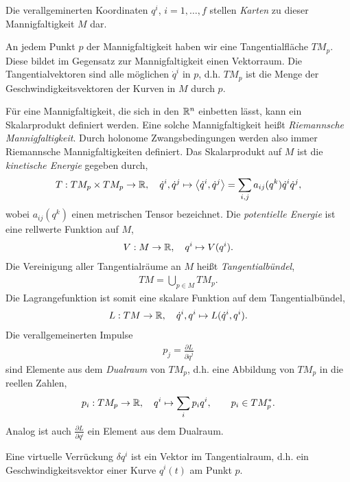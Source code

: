 Die verallgeminerten Koordinaten $q^i$, $i=1,\ldots,f$ stellen \emph{Karten} zu
dieser Mannigfaltigkeit $M$ dar.

An jedem Punkt $p$ der Mannigfaltigkeit haben wir eine Tangentialfläche $TM_p$.
Diese bildet im Gegensatz zur Mannigfaltigkeit einen Vektorraum. Die
Tangentialvektoren sind alle möglichen $\dot{q}^i$ in $p$, d.h. $TM_p$ ist
die Menge der Geschwindigkeitsvektoren der Kurven in $M$ durch $p$.

Für eine Mannigfaltigkeit, die sich in den $\mathbb{R}^n$ einbetten lässt, kann ein
Skalarprodukt definiert werden. Eine solche Mannigfaltigkeit heißt
\emph{Riemannsche Mannigfaltigkeit}. Durch holonome Zwangsbedingungen werden
also immer Riemannsche Mannigfaltigkeiten definiert. Das Skalarprodukt auf $M$ ist die
\emph{kinetische Energie} gegeben durch,
\begin{align*}
T: TM_p\times TM_p \to \mathbb{R},\quad \dot{q}^i,\dot{q}^j \mapsto
\left\langle\dot{q}^i,\dot{q}^j\right\rangle = \sum\limits_{i,j} a_{ij}(q^k)\dot{q}^i\dot{q}^j,
\end{align*}
wobei $a_{ij}(q^k)$ einen metrischen Tensor bezeichnet.
Die \emph{potentielle Energie} ist eine rellwerte Funktion auf $M$,
\begin{align*}
V: M\to \mathbb{R},\quad q^i \mapsto V(q^i).
\end{align*}
Die Vereinigung aller Tangentialräume an $M$ heißt \emph{Tangentialbündel},
\begin{align*}
TM = \bigcup\limits_{p\in M} TM_p.
\end{align*}
Die Lagrangefunktion ist somit eine skalare Funktion auf dem Tangentialbündel,
\begin{align*}
L : TM\to\mathbb{R},\quad \dot{q}^i,q^i  \mapsto L(\dot{q}^i,q^i).
\end{align*} 
Die verallgemeinerten Impulse
\begin{align*}
p_j = \frac{\partial L}{\partial \dot{q}^j}
\end{align*}
sind Elemente aus dem \emph{Dualraum} von $TM_p$, d.h. eine Abbildung von
$TM_p$ in die reellen Zahlen,
\begin{align*}
p_i : TM_p \to \mathbb{R},\quad q^i\mapsto \sum_i p_i q^i,\qquad p_i\in TM_p^*.
\end{align*}
Analog ist auch $\frac{\partial L}{\partial q^i}$ ein Element aus dem Dualraum.

Eine virtuelle Verrückung $\delta q^i$ ist ein Vektor im Tangentialraum, d.h.
ein Geschwindigkeitsvektor einer Kurve $q^i(t)$ am Punkt $p$.

